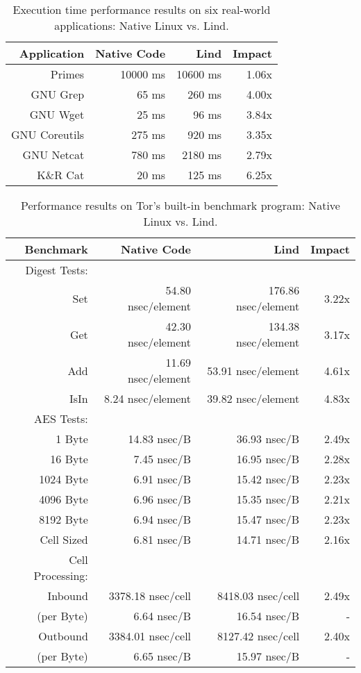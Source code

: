 {{\begin{table}
\centering
\scriptsize
\caption{\small Execution time performance results on six real-world applications: Native
Linux vs. Lind.}
\begin{tabular}{|r|r|r|r|}
  \hline
  {\bf Application} & {\bf Native Code} & {\bf Lind} & {\bf Impact}  \\
  \hline
  Primes & 10000 ms & 10600 ms & 1.06x \\
  GNU Grep & 65 ms & 260 ms & 4.00x \\
  GNU Wget & 25 ms & 96 ms & 3.84x \\
  GNU Coreutils & 275 ms & 920 ms & 3.35x \\
  GNU Netcat & 780 ms & 2180 ms & 2.79x \\
  K\&R Cat & 20 ms & 125 ms & 6.25x \\
  \hline
\end{tabular}
\label{table:performance_apps}
\end{table}

\begin{table}
\centering
\scriptsize
\caption{\small Performance results on Tor's built-in benchmark program: Native
Linux vs. Lind.}
\begin{tabular}{|r|r|r|r|}
  \hline
  {\bf Benchmark} & {\bf Native Code} & {\bf Lind} & {\bf Impact}  \\
  \hline
  Digest Tests: & & & \\
  Set & 54.80 nsec/element & 176.86 nsec/element & 3.22x \\
  Get & 42.30 nsec/element & 134.38 nsec/element & 3.17x \\
  Add & 11.69 nsec/element & 53.91 nsec/element & 4.61x \\
  IsIn & 8.24 nsec/element & 39.82 nsec/element & 4.83x \\
  \hline
  AES Tests: & & & \\
  1 Byte & 14.83 nsec/B & 36.93 nsec/B & 2.49x \\
  16 Byte & 7.45 nsec/B & 16.95 nsec/B & 2.28x \\
  1024 Byte & 6.91 nsec/B & 15.42 nsec/B & 2.23x \\
  4096 Byte & 6.96 nsec/B & 15.35 nsec/B & 2.21x \\
  8192 Byte & 6.94 nsec/B & 15.47 nsec/B & 2.23x \\
  Cell Sized & 6.81 nsec/B & 14.71 nsec/B & 2.16x \\
  \hline
  Cell Processing: & & & \\
  Inbound & 3378.18 nsec/cell & 8418.03 nsec/cell & 2.49x \\
  (per Byte) & 6.64 nsec/B & 16.54 nsec/B & - \\
  Outbound & 3384.01 nsec/cell & 8127.42 nsec/cell & 2.40x \\
  (per Byte) & 6.65 nsec/B & 15.97 nsec/B & - \\
  \hline
\end{tabular}
\label{table:performance_tor}
\end{table}

}}
